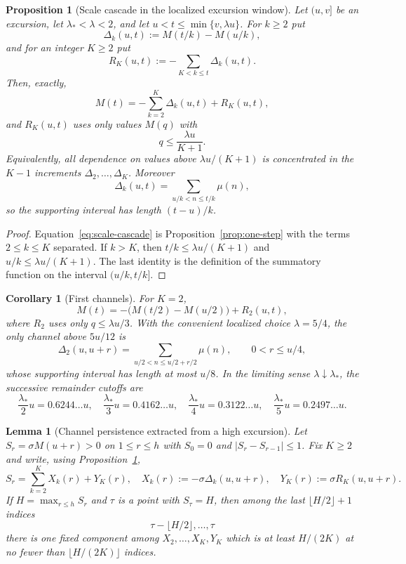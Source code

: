 \documentclass[11pt]{amsart}
\numberwithin{equation}{section}
\theoremstyle{plain}
\newtheorem{proposition}[theorem]{Proposition}
\newtheorem{lemma}[theorem]{Lemma}
\newtheorem{corollary}[theorem]{Corollary}
\theoremstyle{definition}
\theoremstyle{remark}
\begin{document}
\begin{proposition}[Scale cascade in the localized excursion window]
\label{prop:scale-cascade}
Let $(u,v]$ be an excursion, let $\lambda_*<\lambda<2$, and let
$u<t\le\min\{v,\lambda u\}$.  For $k\ge2$ put
\[
\Delta_k(u,t):=M(t/k)-M(u/k),
\]
and for an integer $K\ge2$ put
\[
R_K(u,t):=-\sum_{K<k\le t}\Delta_k(u,t).
\]
Then, exactly,
\begin{equation}
\label{eq:scale-cascade}
M(t)=-\sum_{k=2}^{K}\Delta_k(u,t)+R_K(u,t),
\end{equation}
and $R_K(u,t)$ uses only values $M(q)$ with
\[
q\le\frac{\lambda u}{K+1}.
\]
Equivalently, all dependence on values above $\lambda u/(K+1)$ is
concentrated in the $K-1$ increments
$\Delta_2,\ldots,\Delta_K$.  Moreover
\[
\Delta_k(u,t)=\sum_{u/k<n\le t/k}\mu(n),
\]
so the supporting interval has length $(t-u)/k$.
\end{proposition}

\begin{proof}
Equation~\eqref{eq:scale-cascade} is Proposition~\ref{prop:one-step} with
the terms $2\le k\le K$ separated.  If $k>K$, then
$t/k\le\lambda u/(K+1)$ and $u/k\le\lambda u/(K+1)$.  The last identity is
the definition of the summatory function on the interval $(u/k,t/k]$.
\end{proof}

\begin{corollary}[First channels]
\label{cor:first-channels}
For $K=2$,
\[
M(t)=-\bigl(M(t/2)-M(u/2)\bigr)+R_2(u,t),
\]
where $R_2$ uses only $q\le\lambda u/3$.  With the convenient localized
choice $\lambda=5/4$, the only channel above $5u/12$ is
\[
\Delta_2(u,u+r)=\sum_{u/2<n\le u/2+r/2}\mu(n),
\qquad 0<r\le u/4,
\]
whose supporting interval has length at most $u/8$.  In the limiting
sense $\lambda\downarrow\lambda_*$, the successive remainder cutoffs are
\[
\frac{\lambda_*}{2}u=0.6244\ldots u,\quad
\frac{\lambda_*}{3}u=0.4162\ldots u,\quad
\frac{\lambda_*}{4}u=0.3122\ldots u,\quad
\frac{\lambda_*}{5}u=0.2497\ldots u.
\]
\end{corollary}

\begin{lemma}[Channel persistence extracted from a high excursion]
\label{lem:channel-persistence}
Let $S_r=\sigma M(u+r)>0$ on $1\le r\le h$ with $S_0=0$ and
$|S_r-S_{r-1}|\le1$.  Fix $K\ge2$ and write, using
Proposition~\ref{prop:scale-cascade},
\[
S_r=\sum_{k=2}^{K}X_k(r)+Y_K(r),
\quad
X_k(r):=-\sigma\Delta_k(u,u+r),
\quad
Y_K(r):=\sigma R_K(u,u+r).
\]
If $H=\max_{r\le h}S_r$ and $\tau$ is a point with $S_\tau=H$, then among
the last $\lfloor H/2\rfloor+1$ indices
\[
\tau-\lfloor H/2\rfloor,\ldots,\tau
\]
there is one fixed component among
$X_2,\ldots,X_K,Y_K$ which is at least $H/(2K)$ at no fewer than
$\lfloor H/(2K)\rfloor$ indices.
\end{lemma}
\end{document}
